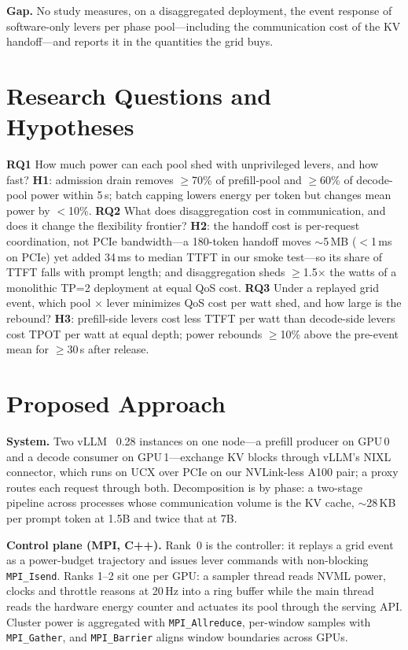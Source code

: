 \documentclass[conference,10pt]{IEEEtran}
\newcommand{\RQ}[1]{\textbf{RQ#1}}
\newcommand{\hy}[1]{\textbf{H#1}}
\begin{document}
\textbf{Gap.} No study measures, on a disaggregated deployment, the event response of software-only levers per phase pool---including the communication cost of the KV handoff---and reports it in the quantities the grid buys.

\section{Research Questions and Hypotheses}
\RQ{1} How much power can each pool shed with unprivileged levers, and how fast? \hy{1}: admission drain removes $\geq$70\% of prefill-pool and $\geq$60\% of decode-pool power within 5\,s; batch capping lowers energy per token but changes mean power by $<$10\%.
\RQ{2} What does disaggregation cost in communication, and does it change the flexibility frontier? \hy{2}: the handoff cost is per-request coordination, not PCIe bandwidth---a 180-token handoff moves $\sim$5\,MB ($<$1\,ms on PCIe) yet added 34\,ms to median TTFT in our smoke test---so its share of TTFT falls with prompt length; and disaggregation sheds $\geq$1.5$\times$ the watts of a monolithic TP=2 deployment at equal QoS cost.
\RQ{3} Under a replayed grid event, which pool $\times$ lever minimizes QoS cost per watt shed, and how large is the rebound? \hy{3}: prefill-side levers cost less TTFT per watt than decode-side levers cost TPOT per watt at equal depth; power rebounds $\geq$10\% above the pre-event mean for $\geq$30\,s after release.

\section{Proposed Approach}
\textbf{System.} Two vLLM~\cite{kwon2023vllm} 0.28 instances on one node---a prefill producer on GPU\,0 and a decode consumer on GPU\,1---exchange KV blocks through vLLM's NIXL connector, which runs on UCX over PCIe on our NVLink-less A100 pair; a proxy routes each request through both. Decomposition is by phase: a two-stage pipeline across processes whose communication volume is the KV cache, $\sim$28\,KB per prompt token at 1.5B and twice that at 7B.

\textbf{Control plane (MPI, C++).} Rank~0 is the controller: it replays a grid event as a power-budget trajectory and issues lever commands with non-blocking \texttt{MPI\_Isend}. Ranks 1--2 sit one per GPU: a sampler thread reads NVML power, clocks and throttle reasons at 20\,Hz into a ring buffer while the main thread reads the hardware energy counter and actuates its pool through the serving API. Cluster power is aggregated with \texttt{MPI\_Allreduce}, per-window samples with \texttt{MPI\_Gather}, and \texttt{MPI\_Barrier} aligns window boundaries across GPUs.
\end{document}
